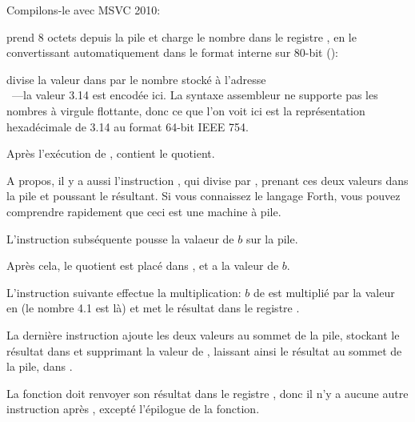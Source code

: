 
Compilons-le avec MSVC 2010:



\FLD prend 8 octets depuis la pile et charge le nombre dans le registre , en
le convertissant automatiquement dans le format interne sur 80-bit ():


\FDIV divise la valeur dans  par le nombre stocké à l'adresse \\
~---la valeur 3.14 est encodée ici.
La syntaxe assembleur ne supporte pas les nombres à virgule flottante, donc ce que
l'on voit ici est la représentation hexadécimale de 3.14 au format 64-bit IEEE 754.

Après l'exécution de \FDIV,  contient le \gls{quotient}.


A propos, il y a aussi l'instruction \FDIVP, qui divise  par , prenant
ces deux valeurs dans la pile et poussant le résultant.
Si vous connaissez le langage Forth\FNURLFORTH, vous pouvez comprendre rapidement
que ceci est une machine à pile\FNURLSTACK.

L'instruction \FLD subséquente pousse la valaeur de $b$ sur la pile.

Après cela, le quotient est placé dans , et  a la valeur de $b$.


L'instruction suivante effectue la multiplication: $b$ de  est multiplié par
la valeur en  (le nombre 4.1 est là) et met le résultat
dans le registre .


La dernière instruction \FADDP ajoute les deux valeurs au sommet de la pile, stockant
le résultat dans  et supprimant la valeur de , laissant ainsi le résultat
au sommet de la pile, dans .

La fonction doit renvoyer son résultat dans le registre , donc il n'y a aucune
autre instruction après \FADDP, excepté l'épilogue de la fonction.


